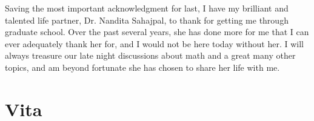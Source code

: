 \documentclass[final, leqno]{ukthesis}
\numberwithin{equation}{chapter}
\def\chzeroloc{Chapter0-Intro/Chapter0-Intro.tex}
\def\choneloc{Chapter1-GF/Chapter1-GF.tex}
\def\chtwoloc{Chapter2-GFmapping/Chapter2-GFmapping.tex}
\def\chthreeloc{Chapter3-xContin/Chapter3-xContin.tex}
\def\chfourloc{Chapter4-Jost/Chapter4-Jost.tex}
\def\apploc{Appendices/Appendices}
\def\bibloc{Bibliography/dissertation.bibliography}
\def\vitaloc{vita.tex}
\begin{document}
\begin{acknowledgments}
	Saving the most important acknowledgment for last, I have my brilliant and
	talented life partner, Dr. Nandita Sahajpal, to thank for getting me through
	graduate school. Over the past several years, she has done more for me 
	that I can ever adequately thank her for, and I would not be here today
	without her. I will always treasure our late night discussions about math
	and a great many other topics, and am beyond fortunate she has chosen to 
	share her life with me.
\end{acknowledgments}

\begin{KeepFromToc}
	\tableofcontents\clearpage
\end{KeepFromToc}
\listoffigures\clearpage




\mainmatter


\begin{DoubleSpace}















\end{DoubleSpace}

\backmatter

\begin{theappendices}
	
\end{theappendices}





\nocite{*}


\chapter{Vita}

\end{document}
